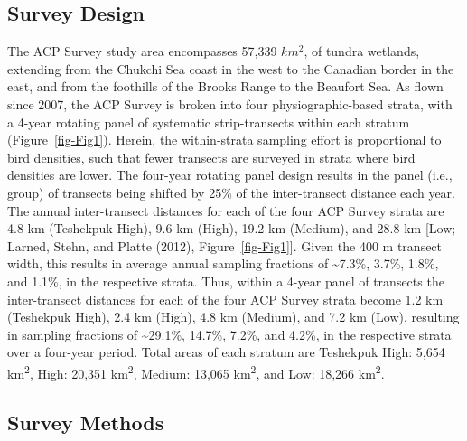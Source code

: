 \documentclass[
]{article}
\begin{document}
\subsection*{Survey Design}\label{survey-design}

The ACP Survey study area encompasses 57,339 \(km^2\), of tundra
wetlands, extending from the Chukchi Sea coast in the west to the
Canadian border in the east, and from the foothills of the Brooks Range
to the Beaufort Sea. As flown since 2007, the ACP Survey is broken into
four physiographic-based strata, with a 4-year rotating panel of
systematic strip-transects within each stratum (Figure~\ref{fig-Fig1}).
Herein, the within-strata sampling effort is proportional to bird
densities, such that fewer transects are surveyed in strata where bird
densities are lower. The four-year rotating panel design results in the
panel (i.e., group) of transects being shifted by 25\% of the
inter-transect distance each year. The annual inter-transect distances
for each of the four ACP Survey strata are 4.8 km (Teshekpuk High), 9.6
km (High), 19.2 km (Medium), and 28.8 km {[}Low; Larned, Stehn, and
Platte (2012), Figure~\ref{fig-Fig1}{]}. Given the 400 m transect width,
this results in average annual sampling fractions of
\textasciitilde7.3\%, 3.7\%, 1.8\%, and 1.1\%, in the respective strata.
Thus, within a 4-year panel of transects the inter-transect distances
for each of the four ACP Survey strata become 1.2 km (Teshekpuk High),
2.4 km (High), 4.8 km (Medium), and 7.2 km (Low), resulting in sampling
fractions of \textasciitilde29.1\%, 14.7\%, 7.2\%, and 4.2\%, in the
respective strata over a four-year period. Total areas of each stratum
are Teshekpuk High: 5,654 km\textsuperscript{2}, High: 20,351
km\textsuperscript{2}, Medium: 13,065 km\textsuperscript{2}, and Low:
18,266 km\textsuperscript{2}.

\subsection*{Survey Methods}\label{survey-methods}
\end{document}
